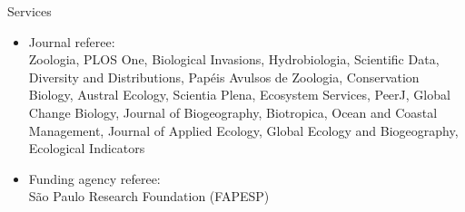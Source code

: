 \documentclass{resume}
\begin{document}

\begin{rSection}{Services}
\begin{itemize}
\item Journal referee:\\
Zoologia, PLOS One, Biological Invasions, Hydrobiologia, Scientific Data, Diversity and Distributions, Papéis Avulsos de Zoologia, Conservation Biology, Austral Ecology, Scientia Plena, Ecosystem Services, PeerJ, Global Change Biology, Journal of Biogeography, Biotropica, Ocean and Coastal Management, Journal of Applied Ecology, Global Ecology and Biogeography, Ecological Indicators

\item Funding agency referee:\\
São Paulo Research Foundation (FAPESP)
\end{itemize}
\end{rSection}

\end{document}
